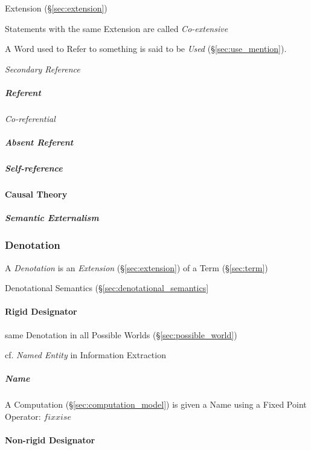 Extension (\S\ref{sec:extension})

Statements with the same Extension are called \emph{Co-extensive}

A Word used to Refer to something is said to be \emph{Used}
(\S\ref{sec:use_mention}).

\emph{Secondary Reference}

\subparagraph{Referent}\label{sec:referent}\hfill

\emph{Co-referential}

\subparagraph{Absent Referent}\label{sec:absent_referent}\hfill

\subparagraph{Self-reference}\label{sec:self_reference}\hfill



\paragraph{Causal Theory}\label{sec:causal_reference}\hfill

\subparagraph{Semantic Externalism}\label{sec:semantic_externalism}\hfill



\subsubsection{Denotation}\label{sec:denotation}

A \emph{Denotation} is an \emph{Extension} (\S\ref{sec:extension}) of
a Term (\S\ref{sec:term})

Denotational Semantics (\S\ref{sec:denotational_semantics}



\paragraph{Rigid Designator}\label{sec:rigid_designator}\hfill

same Denotation in all Possible Worlds (\S\ref{sec:possible_world})

cf. \emph{Named Entity} in Information Extraction



\subparagraph{Name}\label{sec:name}\hfill

A Computation (\S\ref{sec:computation_model}) is given a Name using a
Fixed Point Operator: $fix x is e$



\paragraph{Non-rigid Designator}\label{sec:nonrigid_designator}\hfill

